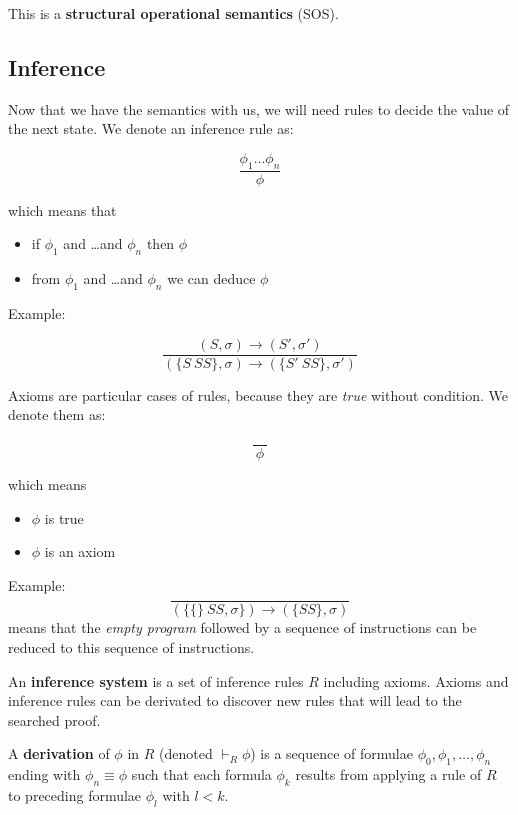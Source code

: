 \documentclass[12pt, a4paper]{book}
\begin{document}
This is a \textbf{structural operational semantics} (SOS).

\subsection{Inference}
\label{sub:Inference}

Now that we have the semantics with us, we will need rules to decide the value
of the next state. We denote an inference rule as:

$$\frac{\phi_{1} \ldots \phi_{n}}{\phi}$$

which means that

\begin{itemize}
    \item if $\phi_1$ and \ldots and $\phi_n$ then $\phi$
    \item from $\phi_1$ and \ldots and $\phi_n$ we can deduce $\phi$
\end{itemize}

Example:

$$
\frac{(S,\sigma) \longrightarrow (S', \sigma')}
{(\{S\ SS\},\sigma) \longrightarrow (\{S'\ SS\}, \sigma')}
$$

Axioms are particular cases of rules, because they are \textit{true} without
condition. We denote them as:

$$
\frac{}
{\ \phi \ }
$$

which means

\begin{itemize}
    \item $\phi$ is true
    \item $\phi$ is an axiom
\end{itemize}

Example:
$$
\frac{}
{(\{ \{ \} \ SS, \sigma \}) \longrightarrow (\{ SS \}, \sigma)}
$$
means that the \textit{empty program} followed by a sequence of instructions can
be reduced to this sequence of instructions. \newline

An \textbf{inference system} is a set of inference rules $R$ including axioms.
Axioms and inference rules can be derivated to discover new rules that will lead
to the searched proof. \newline

A \textbf{derivation} of $\phi$ in $R$ (denoted $\vdash_R \phi$) is a sequence
of formulae $\phi_0,\phi_1,\ldots,\phi_n$ ending with $\phi_n \equiv \phi$ such
that each formula $\phi_k$ results from applying a rule of $R$ to preceding
formulae $\phi_l$ with $l<k$. \newline
\end{document}
